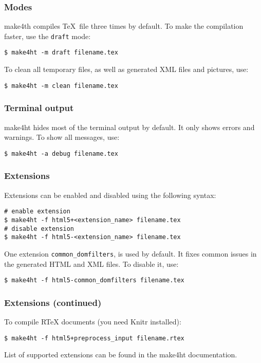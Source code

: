 \documentclass{beamer}
\begin{document}
\begin{frame}[fragile]
  \frametitle{Modes}
  make4th compiles \TeX\ file three times by default. To make the compilation faster, use the \texttt{draft} mode:

\begin{verbatim}
$ make4ht -m draft filename.tex
\end{verbatim}

To clean all temporary files, as well as generated XML files and pictures, use:
\begin{verbatim}
$ make4ht -m clean filename.tex
\end{verbatim}
\end{frame}


\begin{frame}[fragile]
\frametitle{Terminal output}
  make4ht hides most of the terminal output by default. It only shows errors and warnings. To show all
  messages, use:
\begin{verbatim}
$ make4ht -a debug filename.tex
\end{verbatim}
\end{frame}

\begin{frame}[fragile]
\frametitle{Extensions}
Extensions can be enabled and disabled using the following syntax:
\begin{verbatim}
# enable extension
$ make4ht -f html5+<extension_name> filename.tex
# disable extension
$ make4ht -f html5-<extension_name> filename.tex
\end{verbatim}
One extension \verb|common_domfilters|, is used by default. It fixes common issues in the generated HTML and XML files.
To disable it, use:

\begin{verbatim}
$ make4ht -f html5-common_domfilters filename.tex
\end{verbatim}

\end{frame}

\begin{frame}[fragile]
  \frametitle{Extensions (continued)}

To compile RTeX documents (you need Knitr installed):

\begin{verbatim}
$ make4ht -f html5+preprocess_input filename.rtex
\end{verbatim}


List of supported extensions can be found in the make4ht documentation.


\end{frame}
\end{document}
